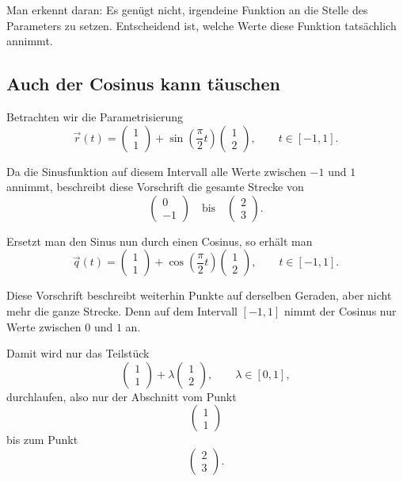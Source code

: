 Man erkennt daran:
Es genügt nicht, irgendeine Funktion an die Stelle des Parameters zu setzen.
Entscheidend ist,
welche Werte diese Funktion tatsächlich annimmt.


\subsection{Auch der Cosinus kann täuschen}

Betrachten wir die Parametrisierung
\[
\vec r(t)=
\begin{pmatrix}
	1\\
	1
\end{pmatrix}
+\sin\!\left(\frac{\pi}{2}t\right)
\begin{pmatrix}
	1\\
	2
\end{pmatrix},
\qquad t\in[-1,1].
\]

Da die Sinusfunktion auf diesem Intervall alle Werte zwischen \(-1\) und \(1\) annimmt,
beschreibt diese Vorschrift die gesamte Strecke von
\[
\begin{pmatrix}
	0\\
	-1
\end{pmatrix}
\quad \text{bis} \quad
\begin{pmatrix}
	2\\
	3
\end{pmatrix}.
\]

Ersetzt man den Sinus nun durch einen Cosinus,
so erhält man
\[
\vec q(t)=
\begin{pmatrix}
	1\\
	1
\end{pmatrix}
+\cos\!\left(\frac{\pi}{2}t\right)
\begin{pmatrix}
	1\\
	2
\end{pmatrix},
\qquad t\in[-1,1].
\]

Diese Vorschrift beschreibt weiterhin Punkte auf derselben Geraden,
aber nicht mehr die ganze Strecke.
Denn auf dem Intervall \([-1,1]\) nimmt der Cosinus nur Werte zwischen \(0\) und \(1\) an.

Damit wird nur das Teilstück
\[
\begin{pmatrix}
	1\\
	1
\end{pmatrix}
+\lambda
\begin{pmatrix}
	1\\
	2
\end{pmatrix},
\qquad \lambda\in[0,1],
\]
durchlaufen,
also nur der Abschnitt vom Punkt
\[
\begin{pmatrix}
	1\\
	1
\end{pmatrix}
\]
bis zum Punkt
\[
\begin{pmatrix}
	2\\
	3
\end{pmatrix}.
\]

